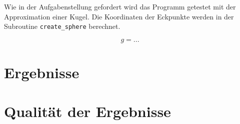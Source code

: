 \documentclass[12pt, a4paper,bibliography=totoc, twoside,BCOR=12.5mm,abstracton]{scrartcl}
\numberwithin{equation}{section}
\begin{document}
Wie in der Aufgabenstellung gefordert wird das Programm getestet mit der Approximation einer Kugel. Die Koordinaten der Eckpunkte werden in der Subroutine \verb+create_sphere+ berechnet.
 
 \begin{equation}
 g = ...
 \label{eq:plouff_3}
 \end{equation}
 
\section{Ergebnisse}

\section{Qualität der Ergebnisse}






 
\end{document}
